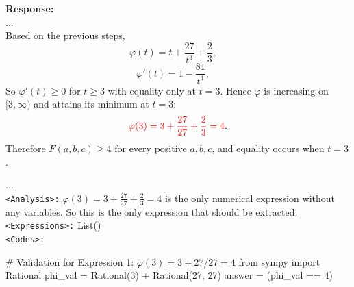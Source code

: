 \begin{examplebox}
\textbf{Response:}\\
...\\
Based on the previous steps, 
\[
\varphi(t) = t + \frac{27}{t^3}+ \frac{2}{3}, \quad 
\]  
\[
\varphi'(t) = 1 - \frac{81}{t^4}, \quad 
\]  
So $\varphi'(t) \geq 0$ for $t \geq 3$ with equality only at $t = 3$.
Hence \(\varphi\) is increasing on \([3,\infty)\) and attains its minimum at \(t = 3\):  
\[
{\textcolor{red}{\varphi(3) = 3 + \frac{27}{27} + \frac{2}{3} = 4}}.
\]  
Therefore  
$
F(a,b,c) \geq 4
$
for every positive \(a, b, c\), and equality occurs when  
\(t = 3\).

...\\

\texttt{<Analysis>:} $\varphi(3) = 3 + \frac{27}{27} + \frac{2}{3} = 4$ is the only numerical expression without any variables. So this is the only expression that should be extracted.  \\

\texttt{<Expressions>:} List()\\

\texttt{<Codes>:}
\begin{examplecodebox}
# Validation for Expression 1: $\varphi(3) = 3 + 27/27 = 4$
from sympy import Rational
phi_val = Rational(3) + Rational(27, 27)
answer = (phi_val == 4)
\end{examplecodebox}
\end{examplebox}
